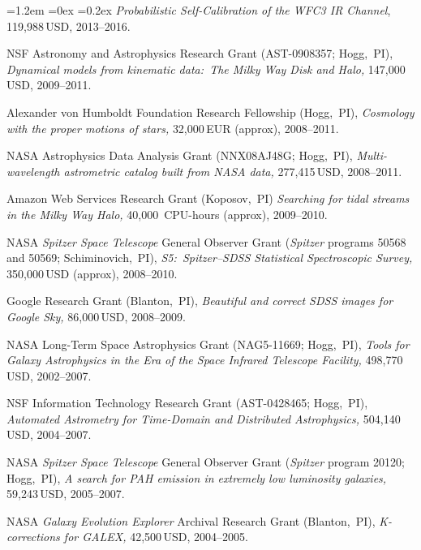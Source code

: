 \documentclass[10pt,letterpaper]{article}
\newcommand{\acronym}[1]{{\small{#1}}}
\newcommand{\project}[1]{\textsl{#1}}
\newcommand{\usd}[1]{{#1}\,\acronym{USD}}
\newcommand{\eur}[1]{{#1}\,\acronym{EUR}}
\newcommand{\grantnumber}[2]{{\footnotesize{#1}}; #2,~\acronym{PI}}
\newcounter{refpubnum}
\newcommand{\hogglist}{%
    \rightmargin=0in
    \leftmargin=1.2em
    \topsep=0ex
    \partopsep=0pt
    \itemsep=0.2ex
    \parsep=0pt
    \itemindent=-1.0\leftmargin
    \listparindent=0.0\leftmargin
    \settowidth{\labelsep}{~}
    \usecounter{refpubnum}
  }
\begin{document}
\begin{list}{}{\hogglist}
\textit{Probabilistic Self-Calibration of the \acronym{WFC3} IR Channel},
\usd{119,988}, 2013--2016.
\item
\acronym{NSF} Astronomy and Astrophysics Research Grant
(\grantnumber{AST-0908357}{Hogg}),
\textit{Dynamical models from kinematic data:\ The Milky Way Disk and Halo,}
\usd{147,000}, 2009--2011.
\item
Alexander von Humboldt Foundation Research Fellowship
(Hogg,~\acronym{PI}),
\textit{Cosmology with the proper motions of stars,}
\eur{32,000} (approx), 2008--2011.
\item
\acronym{NASA} Astrophysics Data Analysis Grant
(\grantnumber{NNX08AJ48G}{Hogg}),
\textit{Multi-wavelength astrometric catalog built from \acronym{NASA} data,}
\usd{277,415}, 2008--2011.
\item
Amazon Web Services Research Grant
(Koposov,~\acronym{PI})
\textit{Searching for tidal streams in the Milky Way Halo,}
40,000~\acronym{CPU}-hours (approx), 2009--2010.
\item
\acronym{NASA} \project{Spitzer Space Telescope} General Observer Grant
(\project{Spitzer} programs {\footnotesize{50568}} and {\footnotesize{50569}}; Schiminovich,~\acronym{PI}),
\textit{\acronym{S5}:\ \project{Spitzer}--\project{\acronym{SDSS}} Statistical Spectroscopic Survey,}
\usd{350,000} (approx), 2008--2010.
\item
Google Research Grant
(Blanton,~\acronym{PI}), 
\textit{Beautiful and correct \project{\acronym{SDSS}} images for \project{Google Sky},}
\usd{86,000}, 2008--2009.
\item
\acronym{NASA} Long-Term Space Astrophysics Grant
(\grantnumber{NAG5-11669}{Hogg}),
\textit{Tools for Galaxy Astrophysics in the Era of the
\project{Space Infrared Telescope Facility,}}
\usd{498,770}, 2002--2007.
\item
\acronym{NSF} Information Technology Research Grant
(\grantnumber{AST-0428465}{Hogg}),
\textit{Automated Astrometry for Time-Domain and Distributed
Astrophysics,}
\usd{504,140}, 2004--2007.
\item
\acronym{NASA} \project{Spitzer Space Telescope} General Observer Grant
(\project{Spitzer} program {\footnotesize{20120}}; Hogg,~\acronym{PI}),
\textit{A search for \acronym{PAH} emission in extremely low luminosity galaxies,}
\usd{59,243}, 2005--2007.
\item
\acronym{NASA} \project{Galaxy Evolution Explorer} Archival Research Grant
(Blanton,~\acronym{PI}),
\textit{K-corrections for \acronym{GALEX},}
\usd{42,500}, 2004--2005.
\item

\end{list}
\end{document}
